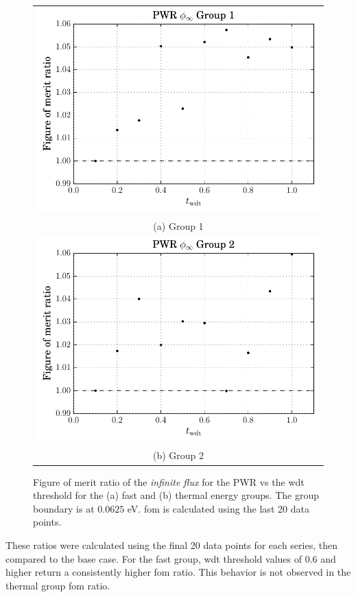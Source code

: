 \begin{figure}[hbtp]
  \centering
  \begin{tabular}{c}
  \includegraphics[scale=0.9]{images/results/pwr_inf_flx_grp_1} \\
    (a) Group 1\\
  \includegraphics[scale=0.9]{images/results/pwr_inf_flx_grp_2} \\
    (b) Group 2
  \end{tabular}
  \caption[Figure of merit ratio of the \textit{infinite flux} for the
  PWR]{Figure of merit ratio of the \textit{infinite flux} for the PWR vs the
    \gls{wdt} threshold for the (a) fast and (b) thermal energy
    groups. The group boundary is at $0.0625$ eV. \gls{fom} is
    calculated using the last 20 data points.}
  \label{fig:pwr_inf_flx}
\end{figure}
%
These ratios were calculated using the final 20 data points for each
series, then compared to the base case. For the fast group, \gls{wdt} threshold values
of 0.6 and higher return a consistently higher \gls{fom} ratio. This
behavior is not observed in the thermal group \gls{fom} ratio.

